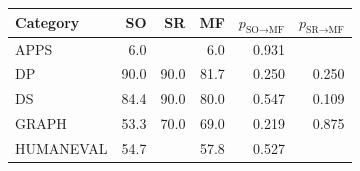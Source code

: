 \begin{tabular}{@{}lrrrrr@{}}
\toprule
Category & SO & SR & MF & $p_{\text{SO}\!\to\!\text{MF}}$ & $p_{\text{SR}\!\to\!\text{MF}}$ \\
\midrule
APPS & 6.0 & \todo{} & 6.0 & 0.931 & \todo{} \\
DP & 90.0 & 90.0 & 81.7 & 0.250 & 0.250 \\
DS & 84.4 & 90.0 & 80.0 & 0.547 & 0.109 \\
GRAPH & 53.3 & 70.0 & 69.0 & 0.219 & 0.875 \\
HUMANEVAL & 54.7 & \todo{} & 57.8 & 0.527 & \todo{} \\
\bottomrule
\end{tabular}
